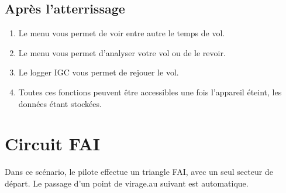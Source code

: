 \subsection*{Après l'atterrissage}
\begin{enumerate}
\item Le menu \blink{}vous permet de voir entre autre le temps de vol.
\item Le menu \blink{}vous permet d'analyser votre vol ou de le revoir.
\item  Le logger IGC vous permet de rejouer le vol.
\item Toutes ces fonctions peuvent être accessibles une fois l'appareil éteint, les données étant stockées.
\end{enumerate}

\section{Circuit FAI}\label{sec:fai-task}

Dans ce scénario, le pilote effectue un triangle FAI, avec un seul secteur de départ. Le passage d'un point de virage.au suivant est automatique.


